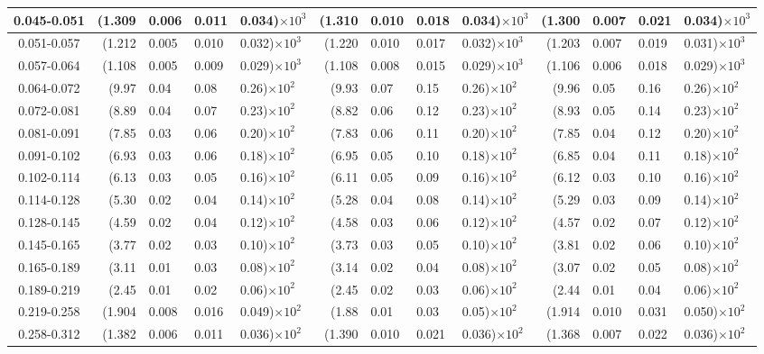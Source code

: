 \begin{table}[!htbp]
{\begin{tabular}{ | c | r@{$\pm$}l@{$\pm$}l@{$\pm$}l | r@{$\pm$}l@{$\pm$}l@{$\pm$}l | r@{$\pm$}l@{$\pm$}l@{$\pm$}l |}
0.045-0.051 & (1.309&0.006&0.011&0.034)$\times 10^{3}$ & (1.310&0.010&0.018&0.034)$\times 10^{3}$ & (1.300&0.007&0.021&0.034)$\times 10^{3}$ \\ \hline
0.051-0.057 & (1.212&0.005&0.010&0.032)$\times 10^{3}$ & (1.220&0.010&0.017&0.032)$\times 10^{3}$ & (1.203&0.007&0.019&0.031)$\times 10^{3}$ \\ \hline
0.057-0.064 & (1.108&0.005&0.009&0.029)$\times 10^{3}$ & (1.108&0.008&0.015&0.029)$\times 10^{3}$ & (1.106&0.006&0.018&0.029)$\times 10^{3}$ \\ \hline
0.064-0.072 & (9.97&0.04&0.08&0.26)$\times 10^{2}$ & (9.93&0.07&0.15&0.26)$\times 10^{2}$ & (9.96&0.05&0.16&0.26)$\times 10^{2}$ \\ \hline
0.072-0.081 & (8.89&0.04&0.07&0.23)$\times 10^{2}$ & (8.82&0.06&0.12&0.23)$\times 10^{2}$ & (8.93&0.05&0.14&0.23)$\times 10^{2}$ \\ \hline
0.081-0.091 & (7.85&0.03&0.06&0.20)$\times 10^{2}$ & (7.83&0.06&0.11&0.20)$\times 10^{2}$ & (7.85&0.04&0.12&0.20)$\times 10^{2}$ \\ \hline
0.091-0.102 & (6.93&0.03&0.06&0.18)$\times 10^{2}$ & (6.95&0.05&0.10&0.18)$\times 10^{2}$ & (6.85&0.04&0.11&0.18)$\times 10^{2}$ \\ \hline
0.102-0.114 & (6.13&0.03&0.05&0.16)$\times 10^{2}$ & (6.11&0.05&0.09&0.16)$\times 10^{2}$ & (6.12&0.03&0.10&0.16)$\times 10^{2}$ \\ \hline
0.114-0.128 & (5.30&0.02&0.04&0.14)$\times 10^{2}$ & (5.28&0.04&0.08&0.14)$\times 10^{2}$ & (5.29&0.03&0.09&0.14)$\times 10^{2}$ \\ \hline
0.128-0.145 & (4.59&0.02&0.04&0.12)$\times 10^{2}$ & (4.58&0.03&0.06&0.12)$\times 10^{2}$ & (4.57&0.02&0.07&0.12)$\times 10^{2}$ \\ \hline
0.145-0.165 & (3.77&0.02&0.03&0.10)$\times 10^{2}$ & (3.73&0.03&0.05&0.10)$\times 10^{2}$ & (3.81&0.02&0.06&0.10)$\times 10^{2}$ \\ \hline
0.165-0.189 & (3.11&0.01&0.03&0.08)$\times 10^{2}$ & (3.14&0.02&0.04&0.08)$\times 10^{2}$ & (3.07&0.02&0.05&0.08)$\times 10^{2}$ \\ \hline
0.189-0.219 & (2.45&0.01&0.02&0.06)$\times 10^{2}$ & (2.45&0.02&0.03&0.06)$\times 10^{2}$ & (2.44&0.01&0.04&0.06)$\times 10^{2}$ \\ \hline
0.219-0.258 & (1.904&0.008&0.016&0.049)$\times 10^{2}$ & (1.88&0.01&0.03&0.05)$\times 10^{2}$ & (1.914&0.010&0.031&0.050)$\times 10^{2}$ \\ \hline
0.258-0.312 & (1.382&0.006&0.011&0.036)$\times 10^{2}$ & (1.390&0.010&0.021&0.036)$\times 10^{2}$ & (1.368&0.007&0.022&0.036)$\times 10^{2}$ \\ \hline

\end{tabular}}
\end{table}
